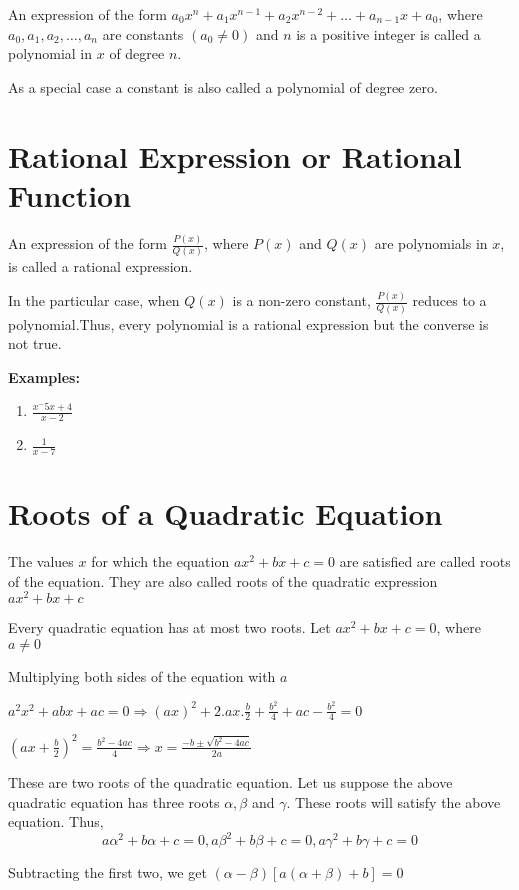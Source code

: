 An expression of the form $a_0x^n + a_1x^{n - 1} + a_2x^{n - 2} + \ldots + a_{n - 1}x + a_0$, where $a_0, a_1, a_2, \ldots, a_n$
are constants $(a_0 \neq 0)$ and $n$ is a positive integer is called a polynomial in $x$ of degree $n$.

As a special case a constant is also called a polynomial of degree zero.

\section{Rational Expression or Rational Function}
An expression of the form $\frac{P(x)}{Q(x)}$, where $P(x)$ and $Q(x)$ are polynomials in $x$, is called a rational expression.

In the particular case, when $Q(x)$ is a non-zero constant, $\frac{P(x)}{Q(x)}$ reduces to a polynomial.Thus, every polynomial is a
rational expression but the converse is not true.

\noindent\textbf{Examples:}
\begin{enumerate}
\item $\frac{x^ - 5x + 4}{x - 2}$
\item $\frac{1}{x - 7}$
\end{enumerate}

\section{Roots of a Quadratic Equation}
The values $x$ for which the equation $ax^2 + bx + c = 0$ are satisfied are called roots of the equation. They are also called
roots of the quadratic expression $ax^2 + bx + c$

Every quadratic equation has at most two roots. Let $ax^2 + bx + c = 0$, where $a\neq 0$

Multiplying both sides of the equation with $a$

$a^2x^2 + abx + ac = 0 \Rightarrow (ax)^2 + 2.ax.\frac{b}{2} + \frac{b^2}{4} + ac - \frac{b^2}{4} = 0$

$\left(ax + \frac{b}{2}\right)^2 = \frac{b^2 - 4ac}{4} \Rightarrow x = \frac{-b \pm\sqrt{b^2 - 4ac}}{2a}$

These are two roots of the quadratic equation. Let us suppose the above quadratic equation has three roots $\alpha, \beta$ and
$\gamma$. These roots will satisfy the above equation. Thus,
$$a\alpha^2 + b\alpha + c = 0, a\beta^2 + b\beta + c = 0, a\gamma^2 + b\gamma + c = 0$$

Subtracting the first two, we get $(\alpha - \beta)[a(\alpha + \beta) + b] = 0$

